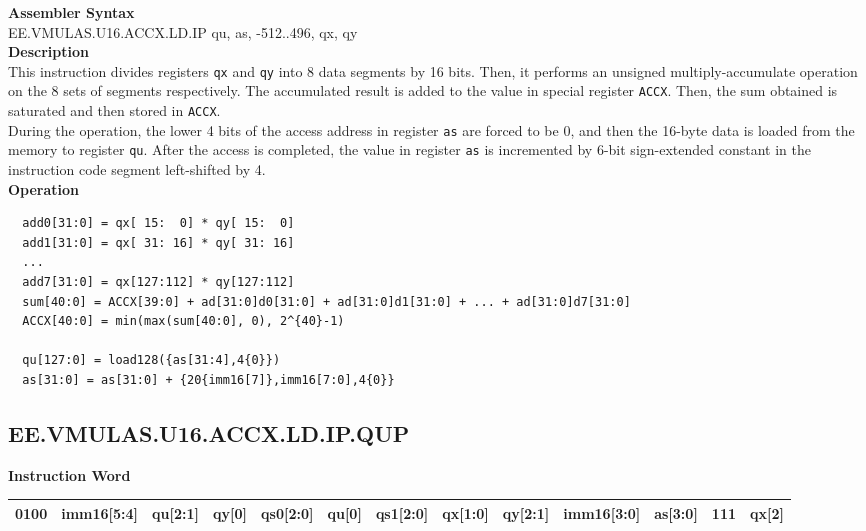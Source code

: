 \textbf{Assembler Syntax} \\
EE.VMULAS.U16.ACCX.LD.IP qu, as, -512..496, qx, qy \\
\textbf{Description} \\
This instruction divides registers \lstinline{qx} and \lstinline{qy} into 8 data segments by 16 bits. Then, it performs an unsigned multiply-accumulate operation on the 8 sets of segments respectively. The accumulated result is added to the value in special register \lstinline{ACCX}. Then, the sum obtained is saturated and then stored in \lstinline{ACCX}. \\ During the operation, the lower 4 bits of the access address in register \lstinline{as} are forced to be 0, and then the 16-byte data is loaded from the memory to register \lstinline{qu}. After the access is completed, the value in register \lstinline{as} is incremented by 6-bit sign-extended constant in the instruction code segment left-shifted by 4.\\
\textbf{Operation}
\begin{lstlisting}
  add0[31:0] = qx[ 15:  0] * qy[ 15:  0]
  add1[31:0] = qx[ 31: 16] * qy[ 31: 16]
  ...
  add7[31:0] = qx[127:112] * qy[127:112]
  sum[40:0] = ACCX[39:0] + ad[31:0]d0[31:0] + ad[31:0]d1[31:0] + ... + ad[31:0]d7[31:0]
  ACCX[40:0] = min(max(sum[40:0], 0), 2^{40}-1)

  qu[127:0] = load128({as[31:4],4{0}})
  as[31:0] = as[31:0] + {20{imm16[7]},imm16[7:0],4{0}}
\end{lstlisting}

\clearpage
\subsection{EE.VMULAS.U16.ACCX.LD.IP.QUP}\label{instruction:EEVMULASU16ACCXLDIPQUP}
\setlength\tabcolsep{5pt}
\textbf{Instruction Word} \\
\begin{tabular}{|c|c|c|c|c|c|c|c|c|c|c|c|c|}
	\hline
	0100 & imm16[5:4] & qu[2:1] & qy[0] & qs0[2:0] & qu[0] & qs1[2:0] & qx[1:0] & qy[2:1] & imm16[3:0] & as[3:0] & 111 & qx[2] \\
	\hline
\end{tabular}

